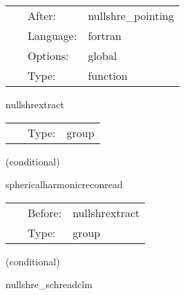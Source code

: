  \begin{tabular*}{160mm}{cll} 
~ & After:  & nullshre\_pointing \\ 
~ & Language:  & fortran \\ 
~ & Options:  & global \\ 
~ & Type:  & function \\ 
\end{tabular*} 


\vspace{5mm}


\hspace{5mm} nullshrextract 

\hspace{5mm}{\it group of the waveform extraction current level } 


\hspace{5mm}

 \begin{tabular*}{160mm}{cll} 
~ & Type:  & group \\ 
\end{tabular*} 


\vspace{5mm}

   (conditional) 

\hspace{5mm} sphericalharmonicreconread 

\hspace{5mm}{\it schedule group for reconstructing current world-tube data } 


\hspace{5mm}

 \begin{tabular*}{160mm}{cll} 
~ & Before:  & nullshrextract \\ 
~ & Type:  & group \\ 
\end{tabular*} 


\vspace{5mm}

   (conditional) 

\hspace{5mm} nullshre\_schreadclm 

\hspace{5mm}{\it current schwarzchild spherical harmonic coefficients } 


\hspace{5mm}

